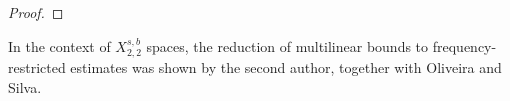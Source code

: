 \documentclass[%
11pt,  reqno]{amsart}
\newcommand{\jap}[1]{\langle #1 \rangle}
\newcommand{\5}{\textup{V}}
\theoremstyle{remark}
\numberwithin{equation}{section}
\numberwithin{theorem}{section}
\begin{document}
{\begin{proof}
		\end{proof}
		
		In the context of $X^{s,b}_{2,2}$ spaces, the reduction of multilinear bounds to frequency-restricted estimates was shown by the second author, together with Oliveira and Silva.
		
}
\end{document}
